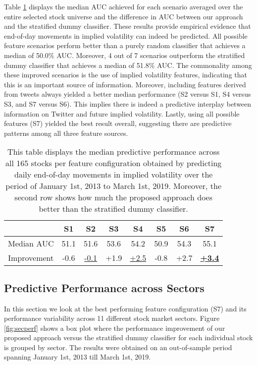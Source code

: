 \documentclass[preprint,1p, times,authoryear]{elsarticle}
\begin{document}
Table \ref{tab:abres} displays the median AUC achieved for each scenario averaged over the entire selected stock universe and the difference in AUC between our approach and the stratified dummy classifier. These results provide empirical evidence that end-of-day movements in implied volatility can indeed be predicted. All possible feature scenarios perform better than a purely random classifier that achieves a median of 50.0\% AUC. Moreover, 4 out of 7 scenarios outperform the stratified dummy classifier that achieves a median of 51.8\% AUC. The commonality among these improved scenarios is the use of implied volatility features, indicating that this is an important source of information. Moreover, including features derived from tweets always yielded a better median performance (S2 versus S1, S4 versus S3, and S7 versus S6). This implies there is indeed a predictive interplay between information on Twitter and future implied volatility. Lastly, using all possible features (S7) yielded the best result overall, suggesting there are predictive patterns among all three feature sources.



\begin{table}[!ht]
\setlength{\tabcolsep}{10pt} %
\caption{This table displays the median predictive performance across all 165 stocks per feature configuration obtained by predicting daily end-of-day movements in implied volatility over the period of January 1st, 2013 to March 1st, 2019. Moreover, the second row shows how much the proposed approach does better than the stratified dummy classifier. }
\centering
\begin{tabular}{cccccccc}
\toprule
                                  & S1 & S2 & S3 & S4 & S5 & S6 & S7 \\
\midrule
\multicolumn{1}{c}{Median AUC} & 51.1       & 51.6       & 53.6       & 54.2       & 50.9       & 54.3 & 55.1       \\
\multicolumn{1}{c}{Improvement} & -0.6          & \underline{-0.1}         & +1.9          & \underline{+2.5}          & -0.8         & +2.7 & \underline{\textbf{+3.4}} \\
\bottomrule
\end{tabular}
\label{tab:abres}
\end{table}


\subsection{Predictive Performance across Sectors}
\label{ch3:sec:sect}
In this section we look at the best performing feature configuration (S7) and its performance variability across 11 different stock market sectors. Figure \ref{fig:secperf} shows a box plot where the performance improvement of our proposed approach versus the stratified dummy classifier for each individual stock is grouped by sector. The results were obtained on an out-of-sample period spanning January 1st, 2013 till March 1st, 2019.
\end{document}
